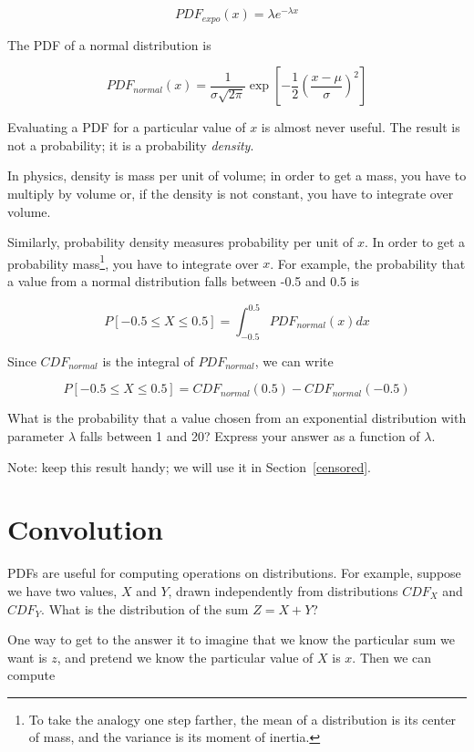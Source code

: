\documentclass[12pt]{book}
\begin{document}
\[ PDF_{expo}(x) = \lambda e^{-\lambda x}   \]

The PDF of a normal distribution is

\[ PDF_{normal}(x) = \frac{1}{\sigma \sqrt{2 \pi}} 
                 \exp \left[ -\frac{1}{2} 
                 \left( \frac{x - \mu}{\sigma} \right)^2 \right]  \]

Evaluating a PDF for a particular value of $x$ is almost never useful.
The result is not a probability; it is a probability {\em density}.

In physics, density is mass per unit of
volume; in order to get a mass, you have to multiply by volume or,
if the density is not constant, you have to integrate over volume.

Similarly, probability density measures probability per unit of $x$.
In order to get a probability mass\footnote{To take the analogy one
step farther, the mean of a distribution is its center of mass, and
the variance is its moment of inertia.}, you have to integrate over $x$.
For example, the probability that a value from a normal distribution
falls between -0.5 and 0.5 is

\[ P[-0.5 \le X \le 0.5] = \int_{-0.5}^{0.5} PDF_{normal}(x) dx \]

Since $CDF_{normal}$ is the integral of $PDF_{normal}$, we can write

\[ P[-0.5 \le X \le 0.5] = CDF_{normal}(0.5) - CDF_{normal}(-0.5) \]


\begin{ex}
\label{expo_pdf}

What is the probability that a value chosen from an exponential
distribution with parameter $\lambda$ falls between 1 and 20?
Express your answer as a function of $\lambda$.

Note: keep this result handy; we will use it in
Section~\ref{censored}.

\end{ex}


\section{Convolution}

PDFs are useful for computing operations on distributions.  For
example, suppose we have two values, $X$ and $Y$, drawn independently
from distributions $CDF_X$ and $CDF_Y$.  What is the distribution of
the sum $Z = X + Y$?

One way to get to the answer it to imagine that we know the particular
sum we want is $z$, and pretend we know the particular value of $X$ is
$x$.  Then we can compute
\end{document}
